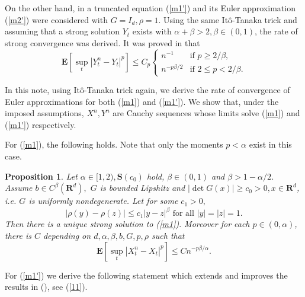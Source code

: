 \documentclass[11pt]{amsart}
\theoremstyle{plain}
\newtheorem{proposition}{Proposition}
\numberwithin{equation}{section}
\begin{document}
On the other hand, in \cite{ta} a truncated equation (\ref{m1'}) and its
Euler approximation (\ref{m2'}) were considered with $G=I_{d},\rho =1$.
Using the same It\^{o}-Tanaka trick and assuming that a strong solution $Y_{t}$ exists with $\alpha +\beta >2,\beta \in \left( 0,1\right) $, the rate
of strong convergence was derived. It was proved in \cite{ta} that 
\begin{equation}
\mathbf{E}\left[ \sup_{t}\left\vert Y_{t}^{n}-Y_{t}\right\vert ^{p}\right]
\leq C_{p}\left\{ 
\begin{array}{cc}
n^{-1} & \text{if }p\geq 2/\beta , \\ 
n^{-p\beta /2} & \text{if }2\leq p<2/\beta .\end{array}\right.  \label{11}
\end{equation}

In this note, using It\^{o}-Tanaka trick again, we derive the rate of
convergence of Euler approximations for both (\ref{m1}) and (\ref{m1'}). We
show that, under the imposed assumptions, $X^{n},Y^{n}$ are Cauchy sequences
whose limits solve (\ref{m1}) and (\ref{m1'}) respectively.

For (\ref{m1}), the following holds. Note that only the moments $p<\alpha $
exist in this case.

\begin{proposition}
\label{pro2}Let $\alpha \in \lbrack 1,2),\mathbf{S}\left( c_{0}\right) $
hold, $\beta \in (0,1)$ and $\beta >1-\alpha /2$. Assume $b\in C^{\beta
}\left( \mathbf{R}^{d}\right) ,$ $G$ is bounded Lipshitz and $\left\vert
\det G\left( x\right) \right\vert \geq c_{0}>0,x\in \mathbf{R}^{d}$, i.e. $G$
is uniformly nondegenerate. Let for some $c_{1}>0,$ 
\begin{equation*}
\left\vert \rho \left( y\right) -\rho \left( z\right) \right\vert \leq
c_{1}\left\vert y-z\right\vert ^{\beta }\text{ for all }\left\vert
y\right\vert =\left\vert z\right\vert =1.
\end{equation*}
Then there is a unique strong solution to (\ref{m1})$.$ Moreover for each $p\in \left( 0,\alpha \right) $, there is $C$ depending on $d,\alpha ,\beta
,b,G,p,\rho $ such that\begin{equation*}
\mathbf{E}\left[ \sup_{t}\left\vert X_{t}^{n}-X_{t}\right\vert ^{p}\right]
\leq Cn^{-p\beta /\alpha }.
\end{equation*}
\end{proposition}

For (\ref{m1'}) we derive the following statement which extends and improves
the results in (\cite{ta}), see (\ref{11}).
\end{document}
